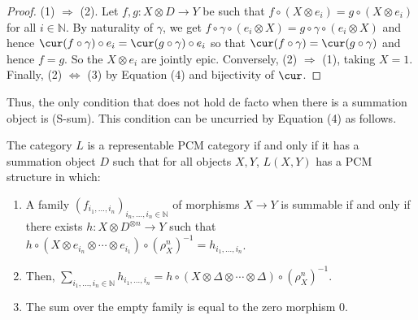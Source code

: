 \begin{proof}(1) $\Rightarrow$ (2). Let $f,g:X\otimes D\to Y$ be such that $f\circ(X\otimes e_i)=g\circ(X\otimes e_i)$ for all $i\in\mathbb N$. By naturality of $\gamma$, we get $f\circ\gamma\circ(e_i\otimes X)=g\circ\gamma\circ(e_i\otimes X)$ and hence $\cur(f\circ\gamma)\circ e_i=\cur(g\circ\gamma)\circ e_i$ so that $\cur(f\circ\gamma)=\cur(g\circ\gamma)$ and hence $f=g$. So the $X\otimes e_i$ are jointly epic. Conversely, (2) $\Rightarrow$ (1), taking $X=1$. Finally, (2) $\Leftrightarrow$ (3) by Equation (4) and bijectivity of $\cur$.\end{proof}
Thus, the only condition that does not hold de facto when there is a summation object is (S-sum). This condition can be uncurried by Equation (4) as follows.

\begin{originalprop}[52] The category $L$ is a representable PCM category if and only if it has a summation object $D$ such that for all objects $X,Y$, $L(X,Y)$ has a PCM structure in which:
\begin{enumerate}\item A family $(f_{i_1,\ldots,i_n})_{i_n,\ldots,i_n\in\mathbb N}$ of morphisms $X\to Y$ is summable if and only if there exists $h:X\otimes D^{\otimes n}\to Y$ such that $h\circ(X\otimes e_{i_n}\otimes\cdots\otimes e_{i_1})\circ(\rho_X^n)^{-1}=h_{i_1,\ldots,i_n}$.
\item Then, $\sum_{i_1,\ldots,i_n\in\mathbb N}h_{i_1,\ldots,i_n}=h\circ(X\otimes\Delta\otimes\cdots\otimes\Delta)\circ(\rho_X^n)^{-1}$.
\item The sum over the empty family is equal to the zero morphism $0$.
\end{enumerate}\end{originalprop}
